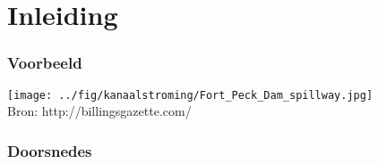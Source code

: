 \documentclass[t]{beamer}
\subtitle{Open kanaalstroming}
\begin{document}
	\frame{\titlepage}
	\section{Inleiding}
	\begin{frame}
		\frametitle{Voorbeeld}
		\center
		\vspace{-0.5cm}
    	\texttt{[image: ../fig/kanaalstroming/Fort\_Peck\_Dam\_spillway.jpg]}\\
    	\footnotesize{Bron: http://billingsgazette.com/}
  	\end{frame}
  	\begin{frame}
  		\frametitle{Doorsnedes}
		\center
  	\end{frame}
\end{document}
